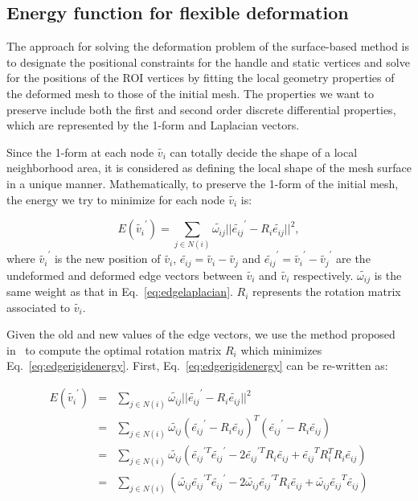 \subsection{Energy function for flexible deformation} The approach
for solving  the deformation problem of the surface-based method is
to designate the positional constraints for the handle and static
vertices and solve for the positions of the ROI vertices by fitting
the local geometry properties of the deformed mesh to those of the
initial mesh. The properties we want to preserve include both the
first and second order discrete differential properties, which are
represented by the 1-form and Laplacian vectors.

Since the 1-form at each node $\tilde{v_i}$ can  totally decide the
shape of a local neighborhood area, it is considered as defining the
local shape of the mesh surface in a unique manner. Mathematically,
to preserve the 1-form of the initial mesh, the energy we try to
minimize for each node $\tilde{v_i}$ is:

\begin{equation}
\label{eq:edgerigidenergy}
E(\tilde{v_i}^\prime)=\sum\limits_{j\in N(i)}{\tilde{\omega_{ij}} ||\tilde{e_{ij}}^\prime -R_i \tilde{e_{ij}}||^2},
\end{equation}
where $\tilde{v_i}^\prime$ is the new  position of $\tilde{v_i}$,
$\tilde{e_{ij}}=\tilde{v_i}-\tilde{v_j}$ and
$\tilde{e_{ij}}^\prime=\tilde{v_i}^\prime-\tilde{v_j}^\prime$ are
the undeformed and deformed edge vectors between $\tilde{v_i}$ and
$\tilde{v_i}$ respectively. $\tilde{\omega_{ij}}$ is the same weight
as that in Eq.~\ref{eq:edgelaplacian}. $R_i$ represents the rotation
matrix associated to $\tilde{v_i}$.

Given the old and new values of the edge vectors, we use the method
proposed in~\cite{SA07} to compute the optimal rotation matrix $R_i$
which minimizes Eq.~\ref{eq:edgerigidenergy}. First, Eq.~\ref{eq:edgerigidenergy}
can be re-written as:

\begin{eqnarray}
\label{eq:rotationmat}
E(\tilde{v_i}^\prime) &=& \sum\limits_{j\in N(i)}{\tilde{\omega_{ij}} ||\tilde{e_{ij}}^\prime -R_i \tilde{e_{ij}}||^2}\nonumber\\
&=& \sum\limits_{j\in N(i)}{\tilde{\omega_{ij}} (\tilde{e_{ij}}^\prime -R_i \tilde{e_{ij}})^T
(\tilde{e_{ij}}^\prime -R_i \tilde{e_{ij}})}\nonumber\\
&=&\sum\limits_{j\in N(i)}{\tilde{\omega_{ij}} (\tilde{e_{ij}}^{\prime T}\tilde{e_{ij}}^\prime
-2\tilde{e_{ij}}^{\prime T}R_i\tilde{e_{ij}}+\tilde{e_{ij}}^T R_i^T R_i \tilde{e_{ij}})}\nonumber\\
&=&\sum\limits_{j\in N(i)}{(\tilde{\omega_{ij}} \tilde{e_{ij}}^{\prime T}\tilde{e_{ij}}^\prime
-2\tilde{\omega_{ij}} \tilde{e_{ij}}^{\prime T}R_i\tilde{e_{ij}}
+\tilde{\omega_{ij}} \tilde{e_{ij}}^T \tilde{e_{ij}})}
\end{eqnarray}

